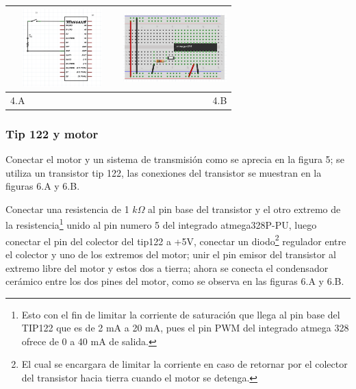 \documentclass[12]{article}
\newenvironment{Figure}
{\par\medskip\noindent\minipage{\linewidth}}
{\endminipage\par\medskip}
\begin{document}
\begin{multicols}{2}
\begin{Figure}
\center
\begin{tabular}{|l|r|}
\hline
\includegraphics[width=4cm, height=3cm]{img/botonesq.png} & \includegraphics[width=4cm, height=3cm]{img/botonpro.png} \\ \hline
4.A & 4.B \\ \hline
\end{tabular}
\label{fig:g4}
\end{Figure}


\subsubsection{Tip 122 y motor}
Conectar el motor y un sistema de transmisión como se aprecia en la figura 5; se utiliza un transistor tip\cite{TIP122} 122, las conexiones del transistor se muestran en la  figuras 6.A y 6.B.

Conectar una resistencia de 1 $k \Omega $ al pin base del transistor y el otro extremo de la resistencia\footnote{Esto con el fin de limitar la corriente de saturación que llega al pin  base del TIP122 que es de 2 mA a 20 mA, pues el pin PWM del integrado atmega 328 ofrece de 0 a 40 mA de salida.}  unido al pin numero 5 del integrado atmega328P-PU, luego conectar el pin del colector del tip122 a +5V, conectar un  diodo\footnote{El cual se encargara de limitar la corriente en caso de retornar por el colector del transistor hacia tierra cuando el motor se detenga.} regulador entre el colector y uno de los extremos del motor; unir el pin emisor del transistor  al extremo libre del motor y estos dos a tierra; ahora se conecta el condensador cerámico entre los dos pines del motor, como se observa en las  figuras 6.A y 6.B.



\end{multicols}
\end{document}
